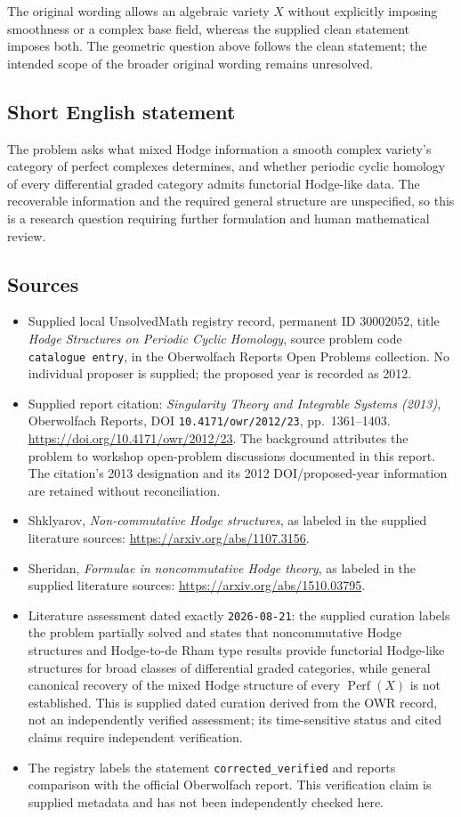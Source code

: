 \documentclass[11pt]{article}
\begin{document}
The original wording allows an algebraic variety \(X\) without explicitly imposing smoothness or a complex base field, whereas the supplied clean statement imposes both. The geometric question above follows the clean statement; the intended scope of the broader original wording remains unresolved.
\subsection{Short English statement}
The problem asks what mixed Hodge information a smooth complex variety's category of perfect complexes determines, and whether periodic cyclic homology of every differential graded category admits functorial Hodge-like data. The recoverable information and the required general structure are unspecified, so this is a research question requiring further formulation and human mathematical review.
\subsection{Sources}
\begin{itemize}
\item Supplied local UnsolvedMath registry record, permanent ID \(30002052\), title \emph{Hodge Structures on Periodic Cyclic Homology}, source problem code \texttt{catalogue entry}, in the Oberwolfach Reports Open Problems collection. No individual proposer is supplied; the proposed year is recorded as 2012.
\item Supplied report citation: \emph{Singularity Theory and Integrable Systems (2013)}, Oberwolfach Reports, DOI \texttt{10.4171/owr/2012/23}, pp.\ 1361--1403. \url{https://doi.org/10.4171/owr/2012/23}. The background attributes the problem to workshop open-problem discussions documented in this report. The citation's 2013 designation and its 2012 DOI/proposed-year information are retained without reconciliation.
\item Shklyarov, \emph{Non-commutative Hodge structures}, as labeled in the supplied literature sources: \url{https://arxiv.org/abs/1107.3156}.
\item Sheridan, \emph{Formulae in noncommutative Hodge theory}, as labeled in the supplied literature sources: \url{https://arxiv.org/abs/1510.03795}.
\item Literature assessment dated exactly \texttt{2026-08-21}: the supplied curation labels the problem partially solved and states that noncommutative Hodge structures and Hodge-to-de Rham type results provide functorial Hodge-like structures for broad classes of differential graded categories, while general canonical recovery of the mixed Hodge structure of every \(\operatorname{Perf}(X)\) is not established. This is supplied dated curation derived from the OWR record, not an independently verified assessment; its time-sensitive status and cited claims require independent verification.
\item The registry labels the statement \texttt{corrected\_verified} and reports comparison with the official Oberwolfach report. This verification claim is supplied metadata and has not been independently checked here.
\end{itemize}
\end{document}
